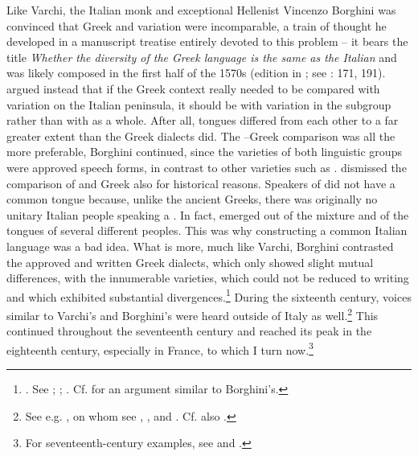 Like Varchi, the Italian monk and exceptional Hellenist Vincenzo Borghini was convinced that Greek and  variation were incomparable, a train of thought he developed in a manuscript treatise entirely devoted to this problem – it bears the title \textit{Whether the diversity of the Greek language is the same as the Italian} and was likely composed in the first half of the 1570s (edition in \citealt{Borghini1971}; see \citealt{Alinei1984}: 171, 191). \citet[335]{Borghini1971} argued instead that if the Greek context really needed to be compared with variation on the Italian peninsula, it should be with variation in the  subgroup rather than with  as a whole. After all,  tongues differed from each other to a far greater extent than the Greek dialects did. The –Greek comparison was all the more preferable, Borghini continued, since the varieties of both linguistic groups were approved speech forms, in contrast to other  varieties such as . \citet[338--340]{Borghini1971} dismissed the comparison of  and Greek also for historical reasons. Speakers of  did not have a common tongue because, unlike the ancient Greeks, there was originally no unitary Italian people speaking a . In fact,  emerged out of the mixture and  of the tongues of several different peoples. This was why constructing a common Italian language was a bad idea. What is more, much like Varchi, Borghini contrasted the approved and written Greek dialects, which only showed slight mutual differences, with the innumerable  varieties, which could not be reduced to writing and which exhibited substantial divergences.\footnote{\citet[341]{Borghini1971}. See \citet[171]{Alinei1984}; \citet[210]{Trovato1984}; \citet[32--37]{Beninca1988}. Cf. \citet[253--254]{Salviati1588} for an argument similar to Borghini’s.} During the sixteenth century, voices similar to Varchi’s and Borghini’s were heard outside of Italy as well.\footnote{See e.g. \citet[595--596]{Wolf1578}, on whom see \citet{Von1856}, \citet[58–59]{Jellinek1898, Jellinek1913}, and \citet[esp. 214--218]{Mattheier2003}. Cf. also \citet[xiii.\textsc{\textsuperscript{v}}]{Palsgrave1530}.} This continued throughout the seventeenth century and reached its peak in the eighteenth century, especially in France, to which I turn now.\footnote{For seventeenth-century examples, see \citet[458--459]{Mambrun1661} and \citet[146--147]{Morhof1685}.}

